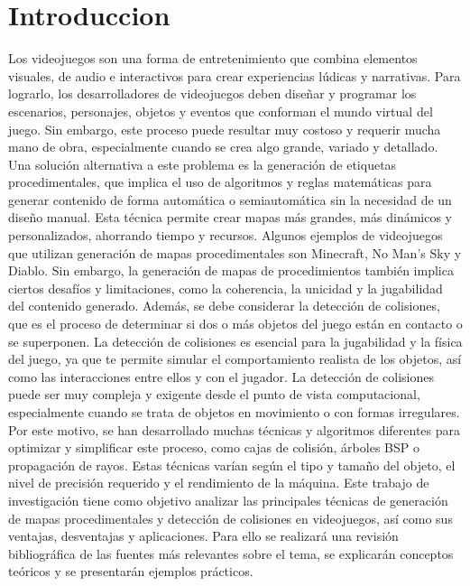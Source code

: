\documentclass[stu, 12pt, letterpaper, donotrepeattitle, floatsintext, natbib]{apa7}
\begin{document}
\section{\large Introduccion}
Los videojuegos son una forma de entretenimiento que combina elementos visuales, de audio e 
interactivos para crear experiencias lúdicas y narrativas. Para lograrlo, los desarrolladores de 
videojuegos deben diseñar y programar los escenarios, personajes, objetos y eventos que 
conforman el mundo virtual del juego. Sin embargo, este proceso puede resultar muy costoso y 
requerir mucha mano de obra, especialmente cuando se crea algo grande, variado y detallado. 
Una solución alternativa a este problema es la generación de etiquetas procedimentales, que 
implica el uso de algoritmos y reglas matemáticas para generar contenido de forma automática 
o semiautomática sin la necesidad de un diseño manual. Esta técnica permite crear mapas más 
grandes, más dinámicos y personalizados, ahorrando tiempo y recursos. Algunos ejemplos de 
videojuegos que utilizan generación de mapas procedimentales son Minecraft, No Man's Sky y 
Diablo. Sin embargo, la generación de mapas de procedimientos también implica ciertos desafíos 
y limitaciones, como la coherencia, la unicidad y la jugabilidad del contenido generado. Además, 
se debe considerar la detección de colisiones, que es el proceso de determinar si dos o más 
objetos del juego están en contacto o se superponen. La detección de colisiones es esencial para 
la jugabilidad y la física del juego, ya que te permite simular el comportamiento realista de los 
objetos, así como las interacciones entre ellos y con el jugador. La detección de colisiones puede 
ser muy compleja y exigente desde el punto de vista computacional, especialmente cuando se 
trata de objetos en movimiento o con formas irregulares. Por este motivo, se han desarrollado 
muchas técnicas y algoritmos diferentes para optimizar y simplificar este proceso, como cajas de 
colisión, árboles BSP o propagación de rayos. Estas técnicas varían según el tipo y tamaño del 
objeto, el nivel de precisión requerido y el rendimiento de la máquina. Este trabajo de investigación 
tiene como objetivo analizar las principales técnicas de generación de mapas procedimentales y detección 
de colisiones en videojuegos, así como sus ventajas, desventajas y aplicaciones. Para ello se realizará 
una revisión bibliográfica de las fuentes más relevantes sobre el tema, se explicarán conceptos teóricos 
y se presentarán ejemplos prácticos.\\
\end{document}
